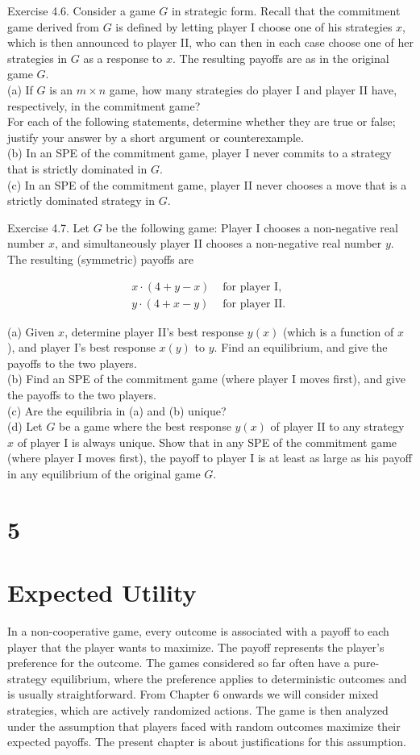 \documentclass[12pt]{article}
\begin{document}
Exercise 4.6. Consider a game $G$ in strategic form. Recall that the commitment game derived from $G$ is defined by letting player I choose one of his strategies $x$, which is then announced to player II, who can then in each case choose one of her strategies in $G$ as a response to $x$. The resulting payoffs are as in the original game $G$.\\
(a) If $G$ is an $m \times n$ game, how many strategies do player I and player II have, respectively, in the commitment game?\\
For each of the following statements, determine whether they are true or false; justify your answer by a short argument or counterexample.\\
(b) In an SPE of the commitment game, player I never commits to a strategy that is strictly dominated in $G$.\\
(c) In an SPE of the commitment game, player II never chooses a move that is a strictly dominated strategy in $G$.

Exercise 4.7. Let $G$ be the following game: Player I chooses a non-negative real number $x$, and simultaneously player II chooses a non-negative real number $y$. The resulting (symmetric) payoffs are

$$
\begin{array}{ll}
x \cdot(4+y-x) & \text { for player I, } \\
y \cdot(4+x-y) & \text { for player II. }
\end{array}
$$

(a) Given $x$, determine player II's best response $y(x)$ (which is a function of $x$ ), and player I's best response $x(y)$ to $y$. Find an equilibrium, and give the payoffs to the two players.\\
(b) Find an SPE of the commitment game (where player I moves first), and give the payoffs to the two players.\\
(c) Are the equilibria in (a) and (b) unique?\\
(d) Let $G$ be a game where the best response $y(x)$ of player II to any strategy $x$ of player I is always unique. Show that in any SPE of the commitment game (where player I moves first), the payoff to player I is at least as large as his payoff in any equilibrium of the original game $G$.

\section*{5}
\section*{Expected Utility}
In a non-cooperative game, every outcome is associated with a payoff to each player that the player wants to maximize. The payoff represents the player's preference for the outcome. The games considered so far often have a pure-strategy equilibrium, where the preference applies to deterministic outcomes and is usually straightforward. From Chapter 6 onwards we will consider mixed strategies, which are actively randomized actions. The game is then analyzed under the assumption that players faced with random outcomes maximize their expected payoffs. The present chapter is about justifications for this assumption.
\end{document}
